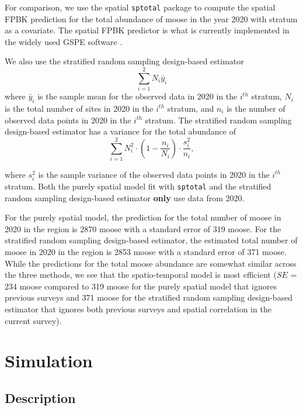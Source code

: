 \documentclass[]{interact}
\theoremstyle{plain}%
\theoremstyle{definition}
\theoremstyle{remark}
\begin{document}
For comparison, we use the spatial \texttt{sptotal} package
\citep{higham2021sptotal} to compute the spatial FPBK prediction
\citep{ver2008spatial} for the total abundance of moose in the year 2020
with stratum as a covariate. The spatial FPBK predictor is what is
currently implemented in the widely used GSPE software
\citep{delong2006geospatial}.

We also use the stratified random sampling design-based estimator
\mbox{} \begin{equation*}
\sum_{i = 1}^{2} N_i \bar{y}_i
\end{equation*} \noindent where \(\bar{y}_i\) is the sample mean for the
observed data in 2020 in the \(i^{th}\) stratum, \(N_i\) is the total
number of sites in 2020 in the \(i^{th}\) stratum, and \(n_i\) is the
number of observed data points in 2020 in the \(i^{th}\) stratum. The
stratified random sampling design-based estimator has a variance for the
total abundance of \mbox{} \begin{equation*}
\sum_{i = 1}^{2} N_i^2 \cdot (1 - \frac{n_i}{N_i}) \cdot \frac{s^2_i}{n_i},
\end{equation*} \noindent

where \(s^2_i\) is the sample variance of the observed data points in
2020 in the \(i^{th}\) stratum. Both the purely spatial model fit with
\texttt{sptotal} and the stratified random sampling design-based
estimator \textbf{only} use data from 2020.

For the purely spatial model, the prediction for the total number of
moose in 2020 in the region is 2870 moose with a standard error of 319
moose. For the stratified random sampling design-based estimator, the
estimated total number of moose in 2020 in the region is 2853 moose with
a standard error of 371 moose. While the predictions for the total moose
abundance are somewhat similar across the three methods, we see that the
spatio-temporal model is most efficient (\(SE\) = 234 moose compared to
319 moose for the purely spatial model that ignores previous surveys and
371 moose for the stratified random sampling design-based estimator that
ignores both previous surveys and spatial correlation in the current
survey).

\section{Simulation} \label{section:Simulation}

\subsection{Description}
\end{document}
